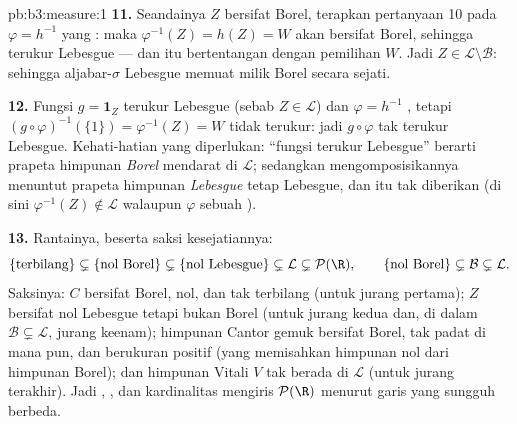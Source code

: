 \begin{solution}{pb:b3:measure:1}
\textbf{11.} Seandainya $Z$ bersifat Borel, terapkan pertanyaan 10 pada
$\varphi = h^{-1}$ yang : maka $\varphi^{-1}(Z) = h(Z) = W$
akan bersifat Borel, sehingga terukur Lebesgue --- dan itu bertentangan dengan
pemilihan $W$. Jadi $Z \in \mathcal L \setminus \mathcal B$:
sehingga aljabar-$\sigma$ Lebesgue memuat milik Borel secara sejati.

\textbf{12.} Fungsi $g = \mathbf 1_Z$ terukur Lebesgue (sebab $Z \in
\mathcal L$) dan $\varphi = h^{-1}$ , tetapi
$(g\circ\varphi)^{-1}(\{1\}) = \varphi^{-1}(Z) = W$ tidak
terukur: jadi $g \circ \varphi$ tak terukur Lebesgue.
Kehati-hatian yang diperlukan: ``fungsi terukur Lebesgue'' berarti prapeta
himpunan \emph{Borel} mendarat di $\mathcal L$; sedangkan mengomposisikannya menuntut
prapeta himpunan \emph{Lebesgue} tetap Lebesgue, dan itu tak
diberikan  (di sini $\varphi^{-1}(Z) \notin
\mathcal L$ walaupun $\varphi$ sebuah ).

\textbf{13.} Rantainya, beserta saksi kesejatiannya:
\[
\{\text{terbilang}\} \subsetneq \{\text{nol Borel}\}
\subsetneq \{\text{nol Lebesgue}\} \subsetneq \mathcal L
\subsetneq \mathcal P(\R),
\qquad
\{\text{nol Borel}\} \subsetneq \mathcal B \subsetneq
\mathcal L .
\]
Saksinya: $C$ bersifat Borel, nol, dan tak terbilang (untuk jurang pertama); $Z$
bersifat nol Lebesgue tetapi bukan Borel (untuk jurang kedua dan, di dalam $\mathcal B
\subsetneq \mathcal L$, jurang keenam); himpunan Cantor gemuk bersifat Borel,
tak padat di mana pun, dan berukuran positif (yang memisahkan himpunan nol dari
himpunan Borel); dan himpunan Vitali $V$ tak berada di $\mathcal L$ (untuk jurang terakhir).
Jadi , , dan kardinalitas mengiris $\mathcal P(\R)$ menurut
garis yang sungguh berbeda.


\end{solution}
